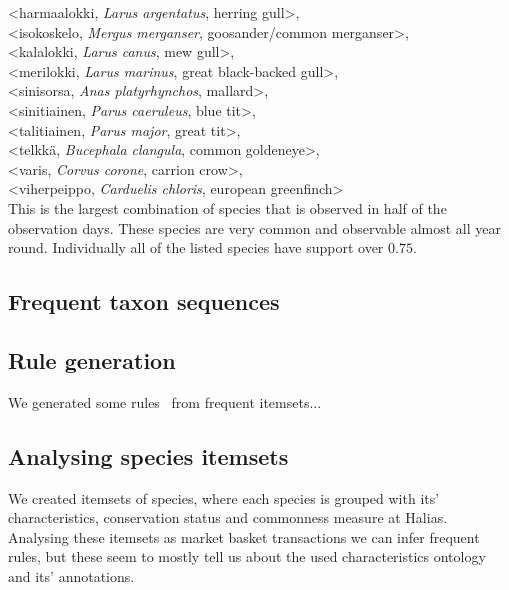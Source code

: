 \documentclass[english]{tktltiki2}
\begin{document}
\hangindent=0.7cm
<harmaalokki, \emph{Larus argentatus}, herring gull>, \\
<isokoskelo, \emph{Mergus merganser}, goosander/common merganser>, \\
<kalalokki, \emph{Larus canus}, mew gull>, \\
<merilokki, \emph{Larus marinus}, great black-backed gull>, \\
<sinisorsa, \emph{Anas platyrhynchos}, mallard>, \\
<sinitiainen, \emph{Parus caeruleus}, blue tit>, \\
<talitiainen, \emph{Parus major}, great tit>, \\
<telkkä, \emph{Bucephala clangula}, common goldeneye>, \\
<varis, \emph{Corvus corone}, carrion crow>, \\
<viherpeippo, \emph{Carduelis chloris}, european greenfinch> \\

This is the largest combination of species that is observed in half of the observation days. These species are very common and observable almost all year round. Individually all of the listed species have support over $0.75$.


\subsection{Frequent taxon sequences}


\subsection{Rule generation}

We generated some rules~\cite{tan2006introduction} from frequent itemsets... %

\subsection{Analysing species itemsets}

We created itemsets of species, where each species is grouped with its' characteristics, conservation status and commonness measure at Halias. Analysing these itemsets as market basket transactions we can infer frequent rules, but these seem to mostly tell us about the used characteristics ontology and its' annotations. 
\end{document}
